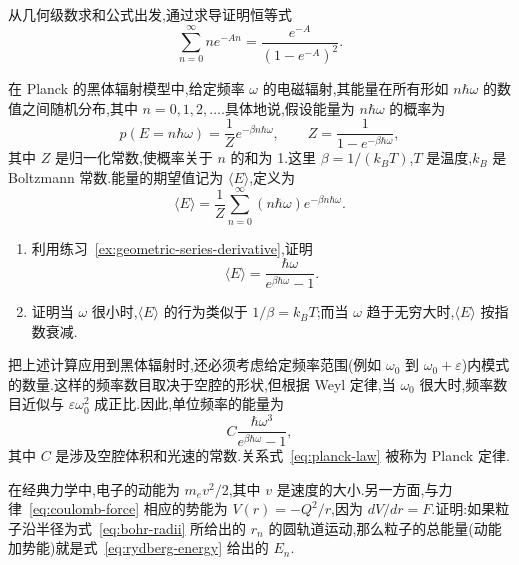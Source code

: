 \begin{exercise}\label{ex:geometric-series-derivative}
从几何级数求和公式出发,通过求导证明恒等式
\begin{equation}
  \sum_{n=0}^{\infty}n e^{-An}=\frac{e^{-A}}{(1-e^{-A})^2}.
\end{equation}
\end{exercise}

\begin{exercise}\label{ex:planck-mean-energy}
在 Planck 的黑体辐射模型中,给定频率 $\omega$ 的电磁辐射,其能量在所有形如 $n\hbar\omega$ 的数值之间随机分布,其中 $n=0,1,2,\ldots$.具体地说,假设能量为 $n\hbar\omega$ 的概率为
\begin{equation}
  p(E=n\hbar\omega)=\frac{1}{Z}e^{-\beta n\hbar\omega},\qquad
  Z=\frac{1}{1-e^{-\beta\hbar\omega}},
\end{equation}
其中 $Z$ 是归一化常数,使概率关于 $n$ 的和为 1.这里 $\beta=1/(k_BT)$,$T$ 是温度,$k_B$ 是 Boltzmann 常数.能量的期望值记为 $\langle E\rangle$,定义为
\begin{equation}
  \langle E\rangle=\frac{1}{Z}\sum_{n=0}^{\infty}(n\hbar\omega)e^{-\beta n\hbar\omega}.
\end{equation}

\begin{enumerate}[label=(\alph*)]
  \item 利用练习~\ref{ex:geometric-series-derivative},证明
  \begin{equation}
    \langle E\rangle=\frac{\hbar\omega}{e^{\beta\hbar\omega}-1}.
  \end{equation}
  \item 证明当 $\omega$ 很小时,$\langle E\rangle$ 的行为类似于 $1/\beta=k_BT$;而当 $\omega$ 趋于无穷大时,$\langle E\rangle$ 按指数衰减.
\end{enumerate}

\begin{note}
把上述计算应用到黑体辐射时,还必须考虑给定频率范围(例如 $\omega_0$ 到 $\omega_0+\varepsilon$)内模式的数量.这样的频率数目取决于空腔的形状,但根据 Weyl 定律,当 $\omega_0$ 很大时,频率数目近似与 $\varepsilon\omega_0^2$ 成正比.因此,单位频率的能量为
\begin{equation}
  C\frac{\hbar\omega^3}{e^{\beta\hbar\omega}-1},\label{eq:planck-law}
\end{equation}
其中 $C$ 是涉及空腔体积和光速的常数.关系式~\eqref{eq:planck-law} 被称为 Planck 定律.
\end{note}
\end{exercise}

\begin{exercise}\label{ex:bohr-energy}
在经典力学中,电子的动能为 $m_ev^2/2$,其中 $v$ 是速度的大小.另一方面,与力律~\eqref{eq:coulomb-force} 相应的势能为 $V(r)=-Q^2/r$,因为 $dV/dr=F$.证明:如果粒子沿半径为式~\eqref{eq:bohr-radii} 所给出的 $r_n$ 的圆轨道运动,那么粒子的总能量(动能加势能)就是式~\eqref{eq:rydberg-energy} 给出的 $E_n$.
\end{exercise}
